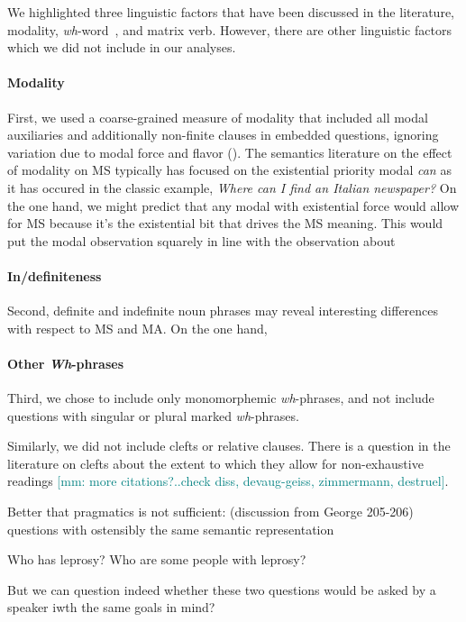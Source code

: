 \documentclass[12pt,letterpaper,table,svgnames,dvipsnames]{article}
\newcommand{\mm}[1]{\textcolor{teal}{[mm: #1]}}
\newcommand{\whw}{\emph{wh}-word~}
\begin{document}
We highlighted three linguistic factors that have been discussed in the literature, modality, \whw, and matrix verb. However, there are other linguistic factors which we did not include in our analyses. 

\paragraph{Modality}
First, we used a coarse-grained measure of modality that included all modal auxiliaries and additionally non-finite clauses in embedded questions, ignoring variation due to modal force and flavor (\cite{kratzer1981,kratzer1991,portner2009}). The semantics literature on the effect of modality on MS typically has focused on the existential priority modal \emph{can} as it has occured in the classic example, \emph{Where can I find an Italian newspaper?} On the one hand, we might predict that any modal with existential force would allow for MS because it's the existential bit that drives the MS meaning. This would put the modal observation squarely in line with the observation about 

\paragraph{In/definiteness}
Second, definite and indefinite noun phrases may reveal interesting differences with respect to MS and MA. On the one hand, 

\paragraph{Other \emph{Wh}-phrases}
Third, we chose to include only monomorphemic \emph{wh}-phrases, and not include questions with singular or plural marked \emph{wh}-phrases. 

Similarly, we did not include clefts or relative clauses. There is a question in the literature on clefts about the extent to which they allow for non-exhaustive readings \mm{more citations?..check diss, devaug-geiss, zimmermann, destruel}.


Better that pragmatics is not sufficient: 
(discussion from George 205-206)
questions with ostensibly the same semantic representation 
\begin{exe}
\ex {}
    \begin{xlist}
        \ex Who has leprosy?
        \ex Who are some people with leprosy?
    \end{xlist}
\end{exe}
But we can question indeed whether these two questions would be asked by a speaker iwth the same goals in mind?
\end{document}
